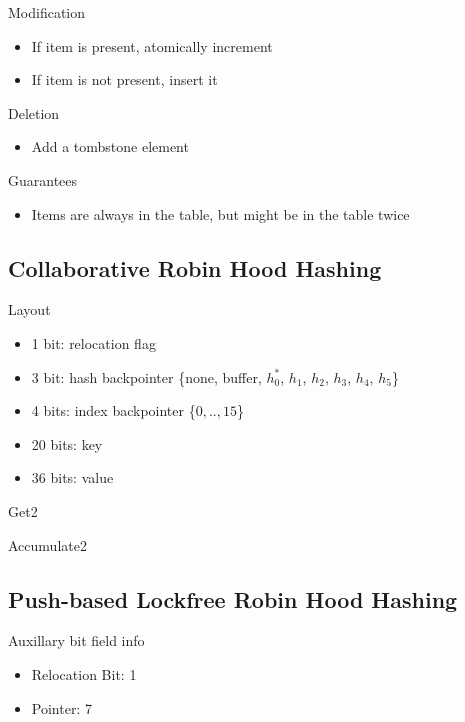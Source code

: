 \documentclass{article}
\begin{document}
Modification
\begin{itemize}
\item If item is present, atomically increment
\item If item is not present, insert it
\end{itemize}

Deletion
\begin{itemize}
\item Add a tombstone element
\end{itemize}

Guarantees
\begin{itemize}
\item Items are always in the table, but might be in the table twice
\end{itemize}

\subsection{Collaborative Robin Hood Hashing}

Layout
\begin{itemize}
\item 1 bit: relocation flag
\item 3 bit: hash backpointer \{none, buffer, $h^*_0$, $h_1$, $h_2$, $h_3$, $h_4$, $h_5$\}
\item 4 bits: index backpointer \{$0,..,15$\}
\item 20 bits: key
\item 36 bits: value
\end{itemize}

Get2

Accumulate2

\subsection{Push-based Lockfree Robin Hood Hashing}

Auxillary bit field info
\begin{itemize}
\item Relocation Bit: 1
\item Pointer: 7
\end{itemize}
\end{document}
